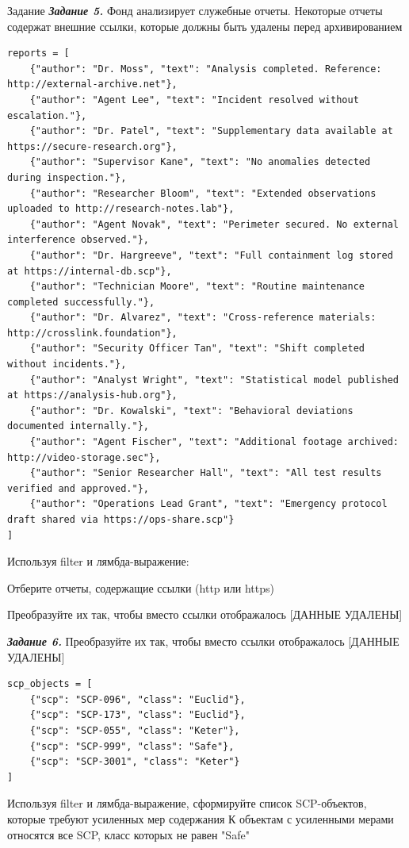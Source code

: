 \documentclass{vvsu}
\begin{document}
\begin{addition}{Задание}
  \textit{\textbf{Задание 5.}}  
  Фонд анализирует служебные отчеты. Некоторые отчеты содержат внешние ссылки, которые должны быть удалены перед архивированием
  \begin{lstlisting}[basicstyle=\ttfamily\small]
  reports = [
    {"author": "Dr. Moss", "text": "Analysis completed. Reference: http://external-archive.net"},
    {"author": "Agent Lee", "text": "Incident resolved without escalation."},
    {"author": "Dr. Patel", "text": "Supplementary data available at https://secure-research.org"},
    {"author": "Supervisor Kane", "text": "No anomalies detected during inspection."},
    {"author": "Researcher Bloom", "text": "Extended observations uploaded to http://research-notes.lab"},
    {"author": "Agent Novak", "text": "Perimeter secured. No external interference observed."},
    {"author": "Dr. Hargreeve", "text": "Full containment log stored at https://internal-db.scp"},
    {"author": "Technician Moore", "text": "Routine maintenance completed successfully."},
    {"author": "Dr. Alvarez", "text": "Cross-reference materials: http://crosslink.foundation"},
    {"author": "Security Officer Tan", "text": "Shift completed without incidents."},
    {"author": "Analyst Wright", "text": "Statistical model published at https://analysis-hub.org"},
    {"author": "Dr. Kowalski", "text": "Behavioral deviations documented internally."},
    {"author": "Agent Fischer", "text": "Additional footage archived: http://video-storage.sec"},
    {"author": "Senior Researcher Hall", "text": "All test results verified and approved."},
    {"author": "Operations Lead Grant", "text": "Emergency protocol draft shared via https://ops-share.scp"}
]
\end{lstlisting}
Используя filter и лямбда-выражение:
\begin{vvsu_list}
  \item Отберите отчеты, содержащие ссылки (http или https)
  \item Преобразуйте их так, чтобы вместо ссылки отображалось [ДАННЫЕ УДАЛЕНЫ]
\end{vvsu_list}

  \textit{\textbf{Задание 6.}}  
  Преобразуйте их так, чтобы вместо ссылки отображалось [ДАННЫЕ УДАЛЕНЫ]
\begin{lstlisting}[basicstyle=\ttfamily\small]
scp_objects = [
    {"scp": "SCP-096", "class": "Euclid"},
    {"scp": "SCP-173", "class": "Euclid"},
    {"scp": "SCP-055", "class": "Keter"},
    {"scp": "SCP-999", "class": "Safe"},
    {"scp": "SCP-3001", "class": "Keter"}
]
\end{lstlisting}
  Используя filter и лямбда-выражение, сформируйте список SCP-объектов, которые требуют усиленных мер содержания
К объектам с усиленными мерами относятся все SCP, класс которых не равен "Safe"


\end{addition}
\end{document}
